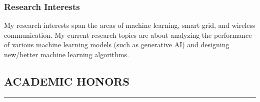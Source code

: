 \documentclass[10pt,letter]{article}
\begin{document}
\begin{small}

\subsubsection*{Research Interests}

\begin{list}{}{}
\item My research interests span the areas of machine learning, smart grid, and wireless communication. My current research topics are about analyzing the performance of various machine learning models (such as generative AI) and designing new/better machine learning algorithms.
\end{list}




\subsection*{ACADEMIC HONORS}
\hrule
\vspace{0.2cm}
\begin{itemize}


\end{itemize}
\end{small}
\end{document}
